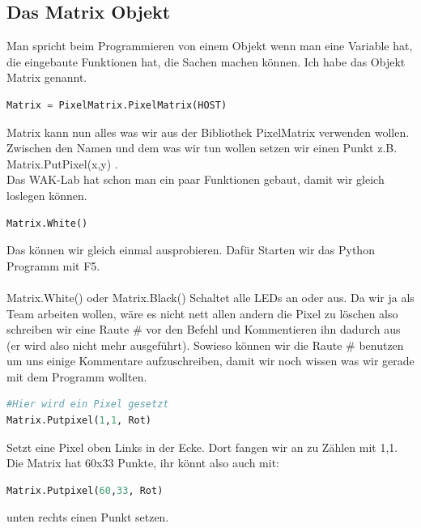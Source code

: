 \subsection{\large{Das Matrix Objekt}}
Man spricht beim Programmieren von einem Objekt wenn man eine Variable hat, die eingebaute Funktionen hat, die Sachen machen können. Ich habe das Objekt Matrix genannt.\\
\begin{lstlisting}[language=Python, caption=Das Matrix Objekt]
Matrix = PixelMatrix.PixelMatrix(HOST)
\end{lstlisting}
Matrix kann nun alles was wir aus der Bibliothek PixelMatrix verwenden wollen. Zwischen den Namen und dem was wir tun wollen setzen wir einen Punkt z.B. Matrix.PutPixel(x,y) .\\
Das WAK-Lab hat schon man ein paar Funktionen gebaut, damit wir gleich loslegen können.\\
\begin{lstlisting}[language=Python, caption=Matrix Löschen]
Matrix.White()
\end{lstlisting}
Das können wir gleich einmal ausprobieren. Dafür Starten wir das Python Programm mit F5.\\
\ \\
Matrix.White() oder Matrix.Black() Schaltet alle LEDs an oder aus. Da wir ja als Team arbeiten wollen, wäre es nicht nett allen andern die Pixel zu löschen also schreiben wir eine Raute \# vor den Befehl und Kommentieren ihn dadurch aus (er wird also nicht mehr ausgeführt). Sowieso können wir die Raute \# benutzen um uns einige Kommentare aufzuschreiben, damit wir noch wissen was wir gerade mit dem Programm wollten.\\
\begin{lstlisting}[language=Python, caption=Einen Pixel setzen]
#Hier wird ein Pixel gesetzt
Matrix.Putpixel(1,1, Rot)
\end{lstlisting}
Setzt eine Pixel oben Links in der Ecke. Dort fangen wir an zu Zählen mit 1,1. Die Matrix hat 60x33 Punkte, ihr könnt also auch mit: \begin{lstlisting}[language=Python, caption=Noch einen Pixel setzen]
Matrix.Putpixel(60,33, Rot)
\end{lstlisting}
unten rechts einen Punkt setzen.\\
